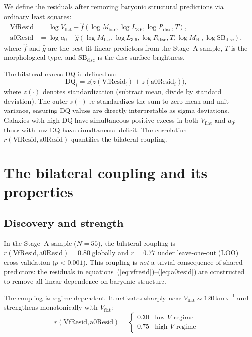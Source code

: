 \documentclass[fleqn,usenatbib]{mnras}
\newcommand{\vflat}{V_\mathrm{flat}}
\newcommand{\azero}{a_0}
\newcommand{\vfresid}{\mathrm{VfResid}}
\newcommand{\aresid}{\mathrm{a0Resid}}
\newcommand{\logA}{\log a_0}
\newcommand{\kms}{\,\mathrm{km\,s}^{-1}}
\newcommand{\DQ}{\mathrm{DQ}}
\begin{document}
We define the residuals after removing baryonic structural predictions via ordinary least squares:
\begin{align}
\vfresid &= \log\vflat - \hat{f}(\log M_\mathrm{bar}, \log L_{3.6}, \log R_\mathrm{disc}, T), \label{eq:vfresid} \\
\aresid &= \logA - \hat{g}(\log M_\mathrm{bar}, \log L_{3.6}, \log R_\mathrm{disc}, T, \log M_\mathrm{HI}, \log \mathrm{SB}_\mathrm{disc}), \label{eq:a0resid}
\end{align}
where $\hat{f}$ and $\hat{g}$ are the best-fit linear predictors from the Stage~A sample, $T$ is the morphological type, and $\mathrm{SB}_\mathrm{disc}$ is the disc surface brightness.

The bilateral excess $\DQ$ is defined as:
\begin{equation}
\DQ_i = z\bigl(z(\vfresid_i) + z(\aresid_i)\bigr), \label{eq:DQ}
\end{equation}
where $z(\cdot)$ denotes standardization (subtract mean, divide by standard deviation).
The outer $z(\cdot)$ re-standardizes the sum to zero mean and unit variance, ensuring $\DQ$ values are directly interpretable as sigma deviations.
Galaxies with high $\DQ$ have simultaneous positive excess in both $\vflat$ and $\azero$; those with low $\DQ$ have simultaneous deficit.
The correlation $r(\vfresid, \aresid)$ quantifies the bilateral coupling.


\section{The bilateral coupling and its properties}
\label{sec:bilateral}

\subsection{Discovery and strength}

In the Stage~A sample ($N = 55$), the bilateral coupling is $r(\vfresid, \aresid) = 0.80$ globally and $r = 0.77$ under leave-one-out (LOO) cross-validation ($p < 0.001$).
This coupling is \emph{not} a trivial consequence of shared predictors: the residuals in equations~(\ref{eq:vfresid})--(\ref{eq:a0resid}) are constructed to remove all linear dependence on baryonic structure.

The coupling is regime-dependent.
It activates sharply near $\vflat \sim 120\kms$ and strengthens monotonically with $\vflat$:
\begin{equation}
r(\vfresid, \aresid) = \begin{cases} 0.30 & \text{low-}V \text{ regime} \\ 0.75 & \text{high-}V \text{ regime} \end{cases}
\end{equation}
\end{document}
